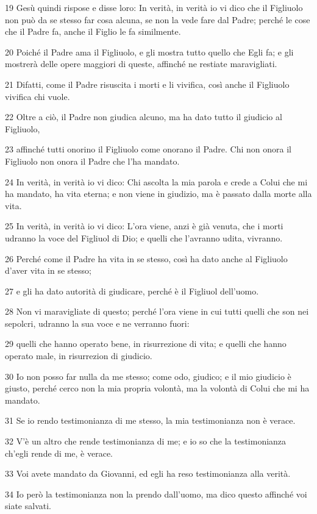 \par 19 Gesù quindi rispose e disse loro: In verità, in verità io vi dico che il Figliuolo non può da se stesso far cosa alcuna, se non la vede fare dal Padre; perché le cose che il Padre fa, anche il Figlio le fa similmente.
\par 20 Poiché il Padre ama il Figliuolo, e gli mostra tutto quello che Egli fa; e gli mostrerà delle opere maggiori di queste, affinché ne restiate maravigliati.
\par 21 Difatti, come il Padre risuscita i morti e li vivifica, così anche il Figliuolo vivifica chi vuole.
\par 22 Oltre a ciò, il Padre non giudica alcuno, ma ha dato tutto il giudicio al Figliuolo,
\par 23 affinché tutti onorino il Figliuolo come onorano il Padre. Chi non onora il Figliuolo non onora il Padre che l'ha mandato.
\par 24 In verità, in verità io vi dico: Chi ascolta la mia parola e crede a Colui che mi ha mandato, ha vita eterna; e non viene in giudizio, ma è passato dalla morte alla vita.
\par 25 In verità, in verità io vi dico: L'ora viene, anzi è già venuta, che i morti udranno la voce del Figliuol di Dio; e quelli che l'avranno udita, vivranno.
\par 26 Perché come il Padre ha vita in se stesso, così ha dato anche al Figliuolo d'aver vita in se stesso;
\par 27 e gli ha dato autorità di giudicare, perché è il Figliuol dell'uomo.
\par 28 Non vi maravigliate di questo; perché l'ora viene in cui tutti quelli che son nei sepolcri, udranno la sua voce e ne verranno fuori:
\par 29 quelli che hanno operato bene, in risurrezione di vita; e quelli che hanno operato male, in risurrezion di giudicio.
\par 30 Io non posso far nulla da me stesso; come odo, giudico; e il mio giudicio è giusto, perché cerco non la mia propria volontà, ma la volontà di Colui che mi ha mandato.
\par 31 Se io rendo testimonianza di me stesso, la mia testimonianza non è verace.
\par 32 V'è un altro che rende testimonianza di me; e io so che la testimonianza ch'egli rende di me, è verace.
\par 33 Voi avete mandato da Giovanni, ed egli ha reso testimonianza alla verità.
\par 34 Io però la testimonianza non la prendo dall'uomo, ma dico questo affinché voi siate salvati.
